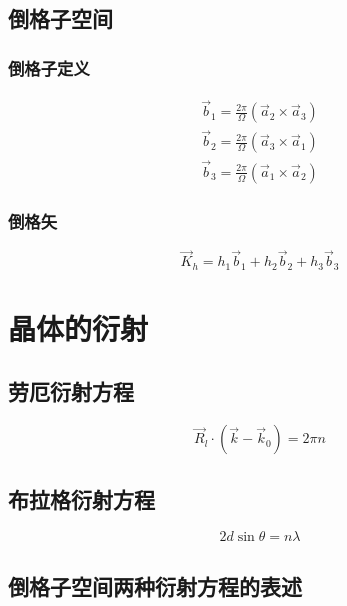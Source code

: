 \documentclass{article}
\begin{document}
\begin{multicols}{2}
\subsection{倒格子空间}

\subsubsection{倒格子定义}

\begin{equation*}
  \begin{aligned}
    \vec{b}_1 = \frac{2\pi}{\Omega} \left( \vec{a}_2 \times \vec{a}_3 \right) \\
    \vec{b}_2 = \frac{2\pi}{\Omega} \left( \vec{a}_3 \times \vec{a}_1 \right) \\
    \vec{b}_3 = \frac{2\pi}{\Omega} \left( \vec{a}_1 \times \vec{a}_2 \right)
  \end{aligned}
\end{equation*}

\subsubsection{倒格矢}

\begin{equation*}
  \vec{K}_h = h_1 \vec{b}_1 + h_2 \vec{b}_2 + h_3 \vec{b}_3
\end{equation*}

\section{晶体的衍射}

\subsection{劳厄衍射方程}

\begin{equation*}
  \vec{R}_l \cdot \left( \vec{k} - \vec{k}_0 \right) = 2\pi n
\end{equation*}

\subsection{布拉格衍射方程}

\begin{equation*}
  2d \sin \theta = n\lambda
\end{equation*}

\subsection{倒格子空间两种衍射方程的表述}


\end{multicols}
\end{document}
